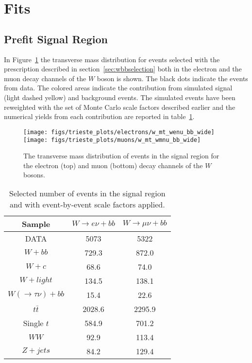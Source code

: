 \section{Fits}\label{sec:Fits}

\subsection{Prefit Signal Region}
\label{sec:backgrounds}

In Figure~\ref{fig:transvMassPrefit} the transverse mass distribution for events
selected with the prescription described in section~\ref{sec:wbbselection} both
in the electron and the muon decay channels of the $W$ boson is shown.
The black dots indicate the events from data. The colored areas indicate
the contribution from simulated signal (light dashed yellow) and
background events.
The simulated events have been reweighted with the set of Monte Carlo scale factors
described earlier and the numerical
 yields from each contribution are reported in table~\ref{tab:yieldsPrefit}.

\begin{figure}[htb]
        \begin{center}
                \leavevmode
                \texttt{[image: figs/trieste\_plots/electrons/w\_mt\_wenu\_bb\_wide]}
                \texttt{[image: figs/trieste\_plots/muons/w\_mt\_wmnu\_bb\_wide]}
        \end{center}
        \caption{The transverse mass distribution of events in the signal region for the
        electron (top) and muon (bottom) decay channels of the $W$ bosons.}
        \label{fig:transvMassPrefit}
\end{figure}


\begin{table}[htb]
\begin{center}
\begin{tabular}{|c|c|c|}
\hline
\textbf{Sample} & $W \rightarrow e \nu + bb$ & $W \rightarrow \mu \nu + bb$ \\
\hline
DATA        & 5073   & 5322 \\
\hline
$W + bb$    & 729.3  & 872.0 \\
$W + c$     & 68.6   & 74.0 \\
$W + light$ & 134.5  & 138.1 \\
$W(\rightarrow \tau \nu) + bb$  & 15.4 & 22.6 \\
$t\bar{t}$  & 2028.6 & 2295.9 \\
Single $t$  & 584.9  & 701.2 \\
$WW$        & 92.9   & 113.4 \\
$Z + jets$  & 84.2   & 129.4 \\
\hline
\end{tabular}
\end{center}
\caption{Selected number of events in the signal region and with event-by-event scale factors applied.}
\label{tab:yieldsPrefit}
\end{table}

